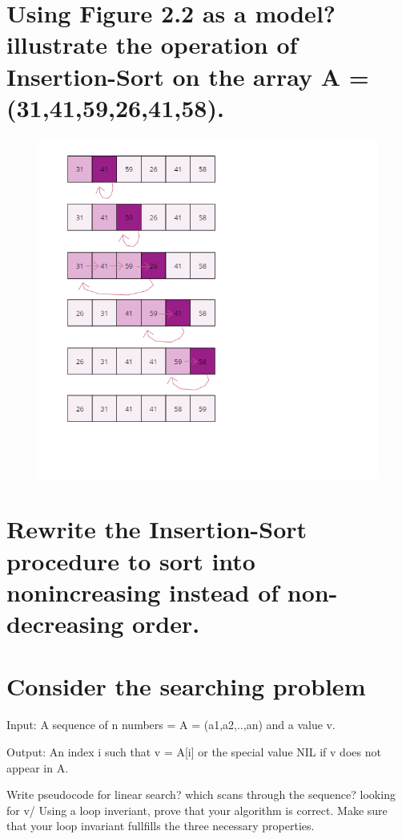 \documentclass{article}
\begin{document}
\section{Using Figure 2.2 as a model? illustrate the operation of Insertion-Sort on the array A = (31,41,59,26,41,58).}
\begin{figure}[!htb] 
  \includegraphics[width=\textwidth]{2_1-1.png}
\end{figure}
 
\section{Rewrite the Insertion-Sort procedure to sort into nonincreasing instead of non-decreasing order.}


\section{Consider the searching problem}


Input: A sequence of n numbers = A = (a1,a2,..,an) and a value v.

Output: An index i such that v = A[i] or the special value NIL if v does not appear in A.

Write pseudocode for linear search? which scans through the sequence? looking for v/ Using a loop inveriant, prove that your algorithm is correct. Make sure that your loop invariant fullfills the three necessary properties.

\end{document}
